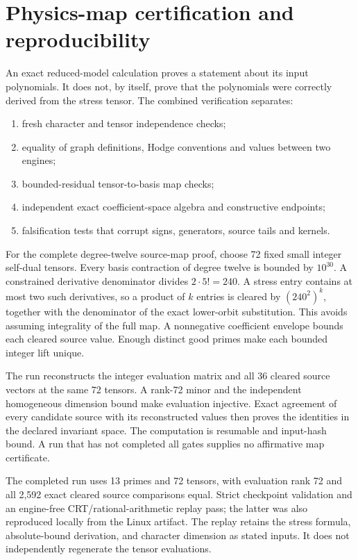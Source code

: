 \documentclass[11pt]{article}
\begin{document}
\section{Physics-map certification and reproducibility}
An exact reduced-model calculation proves a statement about its input
polynomials. It does not, by itself, prove that the polynomials were correctly
derived from the stress tensor. The combined verification separates:
\begin{enumerate}
\item fresh character and tensor independence checks;
\item equality of graph definitions, Hodge conventions and values between two engines;
\item bounded-residual tensor-to-basis map checks;
\item independent exact coefficient-space algebra and constructive endpoints;
\item falsification tests that corrupt signs, generators, source tails and kernels.
\end{enumerate}

For the complete degree-twelve source-map proof, choose 72 fixed small integer
self-dual tensors. Every basis contraction of degree twelve is bounded by
$10^{30}$. A constrained derivative denominator divides $2\cdot5!=240$.
A stress entry contains at most two such derivatives, so a product of $k$
entries is cleared by $(240^2)^k$, together with the denominator of the exact
lower-orbit substitution. This avoids assuming integrality of the full map.
A nonnegative coefficient envelope bounds each cleared source value.
Enough distinct good primes make each bounded integer lift unique.

The run reconstructs the integer evaluation matrix and all 36 cleared source
vectors at the same 72 tensors. A rank-72 minor and the independent homogeneous
dimension bound make evaluation injective. Exact agreement of every candidate
source with its reconstructed values then proves the identities in the declared
invariant space. The computation is resumable and input-hash bound. A run that
has not completed all gates supplies no affirmative map certificate.

The completed run uses 13 primes and 72 tensors, with evaluation rank 72 and
all 2,592 exact cleared source comparisons equal. Strict checkpoint validation
and an engine-free CRT/rational-arithmetic replay pass; the latter was also
reproduced locally from the Linux artifact. The replay retains the stress
formula, absolute-bound derivation, and character dimension as stated inputs.
It does not independently regenerate the tensor evaluations.
\end{document}
